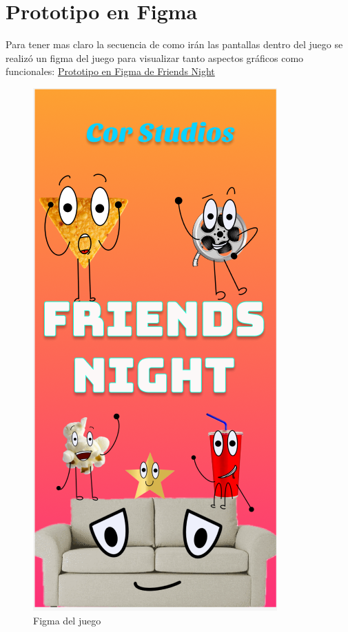 \documentclass[12pt, oneside, letterpaper]{book}
\begin{document}
\chapter{Prototipo en Figma}
\p Para tener mas claro la secuencia de como irán las pantallas dentro del juego se realizó un figma del juego para visualizar tanto aspectos gráficos como funcionales: \href{https://www.figma.com/proto/XxxgYRp8yMguil1C3WnmF8/Friend\%C2\%B4s-Night?type=design&node-id=292-2&t=yDlQBRXyiRyzXJ0W-1&scaling=min-zoom&page-id=0\%3A1&starting-point-node-id=255\%3A2&mode=design}{Prototipo en Figma de Friends Night}
\begin{figure}
\includegraphics[width=.8\textwidth]{FriendsNightFigma.png}%
\caption{Figma del juego }
\label{Figma}
\end{figure}
\end{document}
